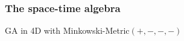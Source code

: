\label{The space-time algebra}
\begin{frame}\frametitle{The space-time algebra}
GA in 4D with Minkowski-Metric$ (+,-,-,-)$

\end{frame}
